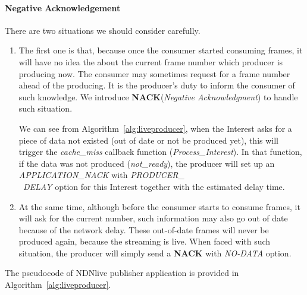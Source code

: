 \paragraph{Negative Acknowledgement} %
\label{par:negative_acknowledgement}
\vspace{0.3cm}
There are two situations we should consider carefully. 
\begin{enumerate}
	\item The first one is that, because once the consumer started consuming frames, it will have no idea the about the current frame number which producer is producing now. The consumer may sometimes request for a frame number ahead of the producing. It is the producer's duty to inform the consumer of such knowledge. We introduce \textbf{NACK}(\textit{Negative Acknowledgment}) to handle such situation. 

	We can see from Algorithm~\ref{alg:liveproducer}, when the Interest asks for a piece of data not existed (out of date or not be produced yet), this will trigger the \textit{cache\_miss} callback function (\textit{Process\_Interest}). In that function, if the data was not produced (\textit{not\_ready}), the producer will set up an \textit{APPLICATION\_NACK} with \textit{PRODUCER\_ \\\ DELAY} option for this Interest together with the estimated delay time.

	\item At the same time, although before the consumer starts to consume frames, it will ask for the current number, such information may also go out of date because of the network delay. These out-of-date frames will never be produced again, because the streaming is live. When faced with such situation, the producer will simply send a \textbf{NACK} with \textit{NO-DATA} option.
\end{enumerate}

The pseudocode of  NDNlive publisher application is provided in Algorithm~\ref{alg:liveproducer}.

